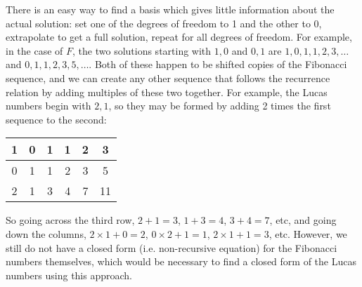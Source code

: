 \documentclass{article}
\begin{document}
There is an easy way to find a basis
which gives little information about the actual solution:
set one of the degrees of freedom to 1 and the other to 0,
extrapolate to get a full solution,
repeat for all degrees of freedom.
For example, in the case of $F$,
the two solutions starting with $1, 0$ and $0, 1$
are $1, 0, 1, 1, 2, 3, \ldots$ and $0, 1, 1, 2, 3, 5, \ldots$.
Both of these happen to be shifted copies of the Fibonacci sequence,
and we can create any other sequence that follows the recurrence relation
by adding multiples of these two together.
For example, the Lucas numbers begin with $2, 1$,
so they may be formed by adding 2 times the first sequence
to the second:
\begin{center}
  \begin{tabular}{|c|c|c|c|c|c|}
    \hline
    1 & 0 & 1 & 1 & 2 & 3 \\ \hline
    0 & 1 & 1 & 2 & 3 & 5 \\ \hline
    2 & 1 & 3 & 4 & 7 & 11 \\ \hline
  \end{tabular}
\end{center}
So going across the third row,
$2+1=3$, $1+3=4$, $3+4=7$, etc,
and going down the columns,
$2 \times 1 + 0 = 2$, $0 \times 2 + 1 = 1$, $2 \times 1 + 1 = 3$, etc.
However, we still do not have a closed form (i.e. non-recursive equation)
for the Fibonacci numbers themselves,
which would be necessary to find a closed form of the Lucas numbers using this approach.



\end{document}
